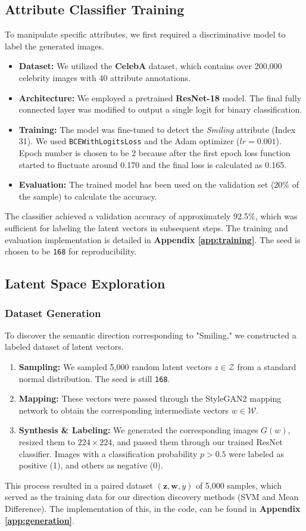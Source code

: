 \documentclass[12pt, a4paper]{article}
\begin{document}
\subsection{Attribute Classifier Training}
To manipulate specific attributes, we first required a discriminative model to label the generated images.
\begin{itemize}
    \item \textbf{Dataset:} We utilized the \textbf{CelebA} dataset, which contains over 200,000 celebrity images with 40 attribute annotations.
    \item \textbf{Architecture:} We employed a pretrained \textbf{ResNet-18} model. The final fully connected layer was modified to output a single logit for binary classification.
    \item \textbf{Training:} The model was fine-tuned to detect the \textit{Smiling} attribute (Index 31). We used \texttt{BCEWithLogitsLoss} and the Adam optimizer ($lr=0.001$). Epoch number is chosen to be 2 because after the first epoch loss function started to fluctuate around 0.170 and the final loss is calculated as 0.165.
    \item \textbf{Evaluation:} The trained model has been used on the validation set (20\% of the sample) to calculate the accuracy.
\end{itemize}
The classifier achieved a validation accuracy of approximately 92.5\%, which was sufficient for labeling the latent vectors in subsequent steps. The training and evaluation implementation is detailed in \textbf{Appendix \ref{app:training}}. The seed is chosen to be \texttt{168} for reproducibility.

\subsection{Latent Space Exploration}
\subsubsection{Dataset Generation}
To discover the semantic direction corresponding to "Smiling," we constructed a labeled dataset of latent vectors.
\begin{enumerate}
    \item \textbf{Sampling:} We sampled 5,000 random latent vectors $z \in \mathcal{Z}$ from a standard normal distribution. The seed is still \texttt{168}.
    \item \textbf{Mapping:} These vectors were passed through the StyleGAN2 mapping network to obtain the corresponding intermediate vectors $w \in \mathcal{W}$.
    \item \textbf{Synthesis \& Labeling:} We generated the corresponding images $G(w)$, resized them to $224 \times 224$, and passed them through our trained ResNet classifier. Images with a classification probability $p > 0.5$ were labeled as positive (1), and others as negative (0).
\end{enumerate}
This process resulted in a paired dataset $(\mathbf{z}, \mathbf{w}, y)$ of 5,000 samples, which served as the training data for our direction discovery methods (SVM and Mean Difference). The implementation of this, in the code, can be found in \textbf{Appendix \ref{app:generation}}.
\end{document}
